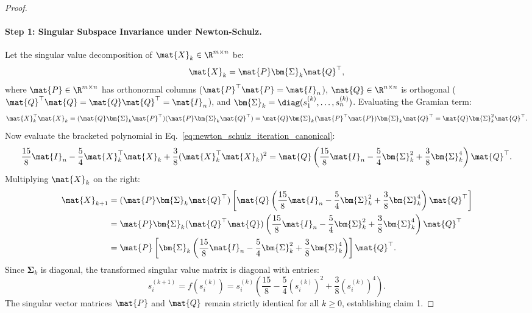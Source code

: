 \begin{proof}
\paragraph{Step 1: Singular Subspace Invariance under Newton-Schulz.}
Let the singular value decomposition of $\mat{X}_k \in \R^{m \times n}$ be:
\begin{equation}
\mat{X}_k = \mat{P} \bm{\Sigma}_k \mat{Q}^\top,
\end{equation}
where $\mat{P} \in \R^{m \times n}$ has orthonormal columns ($\mat{P}^\top \mat{P} = \mat{I}_n$), $\mat{Q} \in \R^{n \times n}$ is orthogonal ($\mat{Q}^\top \mat{Q} = \mat{Q} \mat{Q}^\top = \mat{I}_n$), and $\bm{\Sigma}_k = \diag(s_1^{(k)}, \dots, s_n^{(k)})$.
Evaluating the Gramian term:
\begin{equation}
\mat{X}_k^\top \mat{X}_k = (\mat{Q} \bm{\Sigma}_k \mat{P}^\top)(\mat{P} \bm{\Sigma}_k \mat{Q}^\top) = \mat{Q} \bm{\Sigma}_k (\mat{P}^\top \mat{P}) \bm{\Sigma}_k \mat{Q}^\top = \mat{Q} \bm{\Sigma}_k^2 \mat{Q}^\top.
\end{equation}
Now evaluate the bracketed polynomial in Eq.~\eqref{eq:newton_schulz_iteration_canonical}:
\begin{equation}
\frac{15}{8} \mat{I}_n - \frac{5}{4} \mat{X}_k^\top \mat{X}_k + \frac{3}{8} (\mat{X}_k^\top \mat{X}_k)^2 = \mat{Q} \left( \frac{15}{8} \mat{I}_n - \frac{5}{4} \bm{\Sigma}_k^2 + \frac{3}{8} \bm{\Sigma}_k^4 \right) \mat{Q}^\top.
\end{equation}
Multiplying $\mat{X}_k$ on the right:
\begin{align}
\mat{X}_{k+1} &= (\mat{P} \bm{\Sigma}_k \mat{Q}^\top) \left[ \mat{Q} \left( \frac{15}{8} \mat{I}_n - \frac{5}{4} \bm{\Sigma}_k^2 + \frac{3}{8} \bm{\Sigma}_k^4 \right) \mat{Q}^\top \right] \nonumber \\
&= \mat{P} \bm{\Sigma}_k (\mat{Q}^\top \mat{Q}) \left( \frac{15}{8} \mat{I}_n - \frac{5}{4} \bm{\Sigma}_k^2 + \frac{3}{8} \bm{\Sigma}_k^4 \right) \mat{Q}^\top \nonumber \\
&= \mat{P} \left[ \bm{\Sigma}_k \left( \frac{15}{8} \mat{I}_n - \frac{5}{4} \bm{\Sigma}_k^2 + \frac{3}{8} \bm{\Sigma}_k^4 \right) \right] \mat{Q}^\top.
\end{align}
Since $\bm{\Sigma}_k$ is diagonal, the transformed singular value matrix is diagonal with entries:
\begin{equation}
s_i^{(k+1)} = f(s_i^{(k)}) = s_i^{(k)} \left( \frac{15}{8} - \frac{5}{4} (s_i^{(k)})^2 + \frac{3}{8} (s_i^{(k)})^4 \right).
\label{eq:scalar_singular_value_map}
\end{equation}
The singular vector matrices $\mat{P}$ and $\mat{Q}$ remain strictly identical for all $k \ge 0$, establishing claim 1.


\end{proof}

